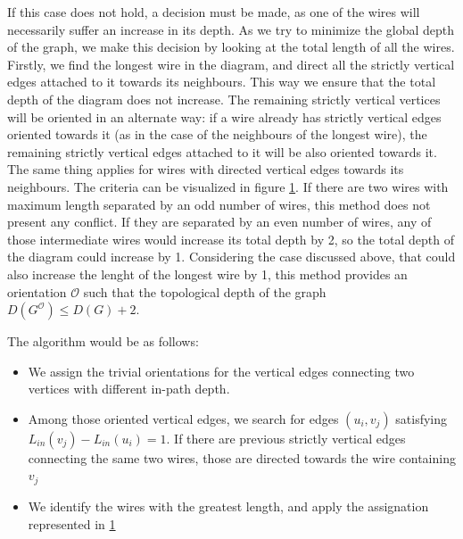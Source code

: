 \documentclass[12pt, twoside, openany]{book}
\begin{document}
If this case does not hold, a decision must be made, as one of the wires will necessarily suffer an increase in its depth. As we try to minimize the global depth of the graph, we make this decision by looking at the total length of all the wires. Firstly, we find the longest wire in the diagram, and direct all the strictly vertical edges attached to it towards its neighbours. This way we ensure that the total depth of the diagram does not increase. The remaining strictly vertical vertices will be oriented in an alternate way: if a wire already has strictly vertical edges oriented towards it (as in the case of the neighbours of the longest wire), the remaining strictly vertical edges attached to it will be also oriented towards it. The same thing applies for wires with directed vertical edges towards its neighbours. The criteria can be visualized in figure \ref{fig:orientation_assignation}. If there are two wires with maximum length separated by an odd number of wires, this method does not present any conflict. If they are separated by an even number of wires, any of those intermediate wires would increase its total depth by 2, so the total depth of the diagram could increase by 1. Considering the case discussed above, that could also increase the lenght of the longest wire by 1, this method provides an orientation $\mathcal{O}$ such that the topological depth of the graph $D(G^\mathcal{O}) \leq D(G) + 2$.\\

\begin{figure} [ht]
    \centering
    
    \caption{}
    \label{fig:orientation_assignation}
\end{figure}

The algorithm would be as follows:

\begin{itemize}
    \item We assign the trivial orientations for the vertical edges connecting two vertices with different in-path depth.
    \item Among those oriented vertical edges, we search for edges $(u_i, v_j)$ satisfying $L_{in}(v_j) - L_{in}(u_i) = 1$. If there are previous strictly vertical edges connecting the same two wires, those are directed towards the wire containing $v_j$
    \item We identify the wires with the greatest length, and apply the assignation represented in \ref{fig:orientation_assignation}
\end{itemize}
\end{document}
